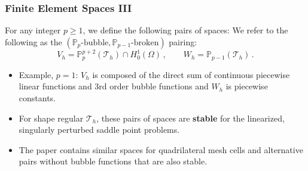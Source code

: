 \documentclass[aspectratio=169,xcolor=dvipsnames,11pt]{beamer}
\begin{document}
\begin{frame}\frametitle{Finite Element Spaces III}
For any integer $p \geq 1$, we define the following pairs of spaces:
\label{eq:SubspacePairs}
\smallskip
We refer to the following as the $(\mathbb{P}_p\text{-bubble},\mathbb{P}_{p-1}\text{-broken})$ pairing:
\begin{equation*}
\label{eq:SubspacePair1}
	V_h = \mathbb{P}_{p}^{p+2}(\mathcal{T}_h)\cap H^1_0(\Omega)
	\,,\qquad
	W_h = \mathbb{P}_{p-1}(\mathcal{T}_h)
	\,.
\end{equation*}
%
\vspace{-3ex}
\begin{itemize}
\item Example, $p = 1$: $V_h$ is composed of the direct sum of continuous piecewise linear functions and 3rd order bubble functions and $W_h$ is piecewise constants. \pause
\item
For shape regular $\mathcal{T}_h$, these pairs of spaces are \textbf{stable} for the linearized, singularly perturbed saddle point problems.
\item 
The paper contains similar spaces for quadrilateral mesh cells and alternative pairs without bubble functions that are also stable.
\end{itemize}
\end{frame}
\end{document}
